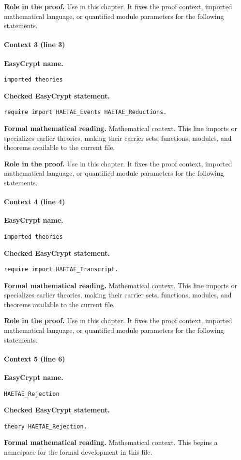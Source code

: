 \noindent\textbf{Role in the proof.}
Use in this chapter. It fixes the proof context, imported mathematical language, or quantified module parameters for the following statements.

\paragraph{Context 3 (line 3)}
\noindent\textbf{EasyCrypt name.}
\begin{lstlisting}[language=EasyCrypt,basicstyle=\ttfamily\scriptsize]
imported theories
\end{lstlisting}
\noindent\textbf{Checked EasyCrypt statement.}
\begin{lstlisting}[language=EasyCrypt,basicstyle=\ttfamily\scriptsize]
require import HAETAE_Events HAETAE_Reductions.
\end{lstlisting}
\noindent\textbf{Formal mathematical reading.}
Mathematical context. This line imports or specializes earlier theories, making their carrier sets, functions, modules, and theorems available to the current file.

\noindent\textbf{Role in the proof.}
Use in this chapter. It fixes the proof context, imported mathematical language, or quantified module parameters for the following statements.

\paragraph{Context 4 (line 4)}
\noindent\textbf{EasyCrypt name.}
\begin{lstlisting}[language=EasyCrypt,basicstyle=\ttfamily\scriptsize]
imported theories
\end{lstlisting}
\noindent\textbf{Checked EasyCrypt statement.}
\begin{lstlisting}[language=EasyCrypt,basicstyle=\ttfamily\scriptsize]
require import HAETAE_Transcript.
\end{lstlisting}
\noindent\textbf{Formal mathematical reading.}
Mathematical context. This line imports or specializes earlier theories, making their carrier sets, functions, modules, and theorems available to the current file.

\noindent\textbf{Role in the proof.}
Use in this chapter. It fixes the proof context, imported mathematical language, or quantified module parameters for the following statements.

\paragraph{Context 5 (line 6)}
\noindent\textbf{EasyCrypt name.}
\begin{lstlisting}[language=EasyCrypt,basicstyle=\ttfamily\scriptsize]
HAETAE_Rejection
\end{lstlisting}
\noindent\textbf{Checked EasyCrypt statement.}
\begin{lstlisting}[language=EasyCrypt,basicstyle=\ttfamily\scriptsize]
theory HAETAE_Rejection.
\end{lstlisting}
\noindent\textbf{Formal mathematical reading.}
Mathematical context. This begins a namespace for the formal development in this file.

